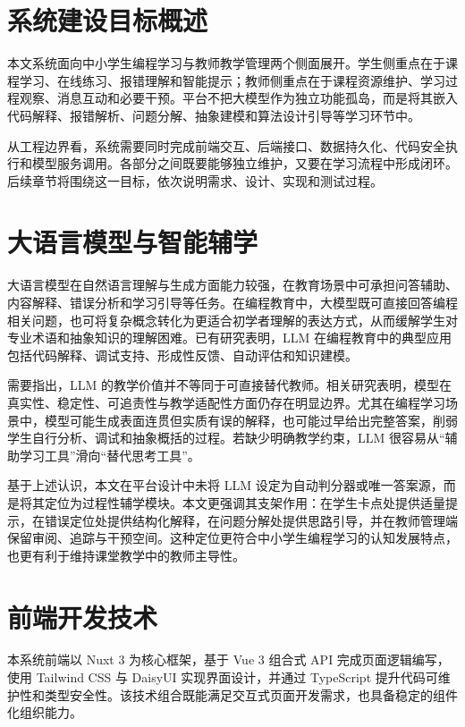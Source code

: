 \section{系统建设目标概述}
本文系统面向中小学生编程学习与教师教学管理两个侧面展开。学生侧重点在于课程学习、在线练习、报错理解和智能提示；教师侧重点在于课程资源维护、学习过程观察、消息互动和必要干预。平台不把大模型作为独立功能孤岛，而是将其嵌入代码解释、报错解析、问题分解、抽象建模和算法设计引导等学习环节中。

从工程边界看，系统需要同时完成前端交互、后端接口、数据持久化、代码安全执行和模型服务调用。各部分之间既要能够独立维护，又要在学习流程中形成闭环。后续章节将围绕这一目标，依次说明需求、设计、实现和测试过程。

\section{大语言模型与智能辅学}
大语言模型在自然语言理解与生成方面能力较强，在教育场景中可承担问答辅助、内容解释、错误分析和学习引导等任务\cite{wang2024llmedu,raihan2025cseduslr}。在编程教育中，大模型既可直接回答编程相关问题，也可将复杂概念转化为更适合初学者理解的表达方式，从而缓解学生对专业术语和抽象知识的理解困难。已有研究表明，LLM 在编程教育中的典型应用包括代码解释、调试支持、形成性反馈、自动评估和知识建模\cite{raihan2025cseduslr,pitts2025llmprogedu}。

需要指出，LLM 的教学价值并不等同于可直接替代教师。相关研究表明，模型在真实性、稳定性、可追责性与教学适配性方面仍存在明显边界\cite{pirzado2024pitfalls,humble2024risk,tlili2023devilangel}。尤其在编程学习场景中，模型可能生成表面连贯但实质有误的解释，也可能过早给出完整答案，削弱学生自行分析、调试和抽象概括的过程\cite{pirzado2024pitfalls,gonzalez2025k12gpt}。若缺少明确教学约束，LLM 很容易从“辅助学习工具”滑向“替代思考工具”。

基于上述认识，本文在平台设计中未将 LLM 设定为自动判分器或唯一答案源，而是将其定位为过程性辅学模块。本文更强调其支架作用：在学生卡点处提供适量提示，在错误定位处提供结构化解释，在问题分解处提供思路引导，并在教师管理端保留审阅、追踪与干预空间\cite{ma2024teachableagent,tang2025middleschool}。这种定位更符合中小学生编程学习的认知发展特点，也更有利于维持课堂教学中的教师主导性。

\section{前端开发技术}
本系统前端以 Nuxt 3 为核心框架，基于 Vue 3 组合式 API 完成页面逻辑编写，使用 Tailwind CSS 与 DaisyUI 实现界面设计，并通过 TypeScript 提升代码可维护性和类型安全性。该技术组合既能满足交互式页面开发需求，也具备稳定的组件化组织能力。

